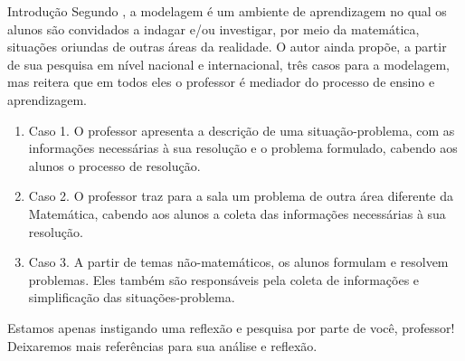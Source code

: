\begin{apresentacao}{Introdução}
  Segundo \citet{barbosa2001}, a modelagem é um ambiente de aprendizagem no qual os alunos são convidados a indagar e/ou investigar, por meio da matemática, situações oriundas de outras áreas da realidade. O autor ainda propõe, a partir de sua pesquisa em nível nacional e internacional, três casos para a modelagem, mas reitera que em todos eles o professor é mediador do processo de ensino e aprendizagem.

  \begin{enumerate}[label=\titem{\arabic*)}]
  \item Caso 1. O professor apresenta a descrição de uma situação-problema, com as informações necessárias à sua resolução e o problema formulado, cabendo aos alunos o processo de resolução. 
  \item Caso 2. O professor traz para a sala um problema de outra área diferente da Matemática, cabendo aos alunos a coleta das informações necessárias à sua resolução. 
  \item Caso 3. A partir de temas não-matemáticos, os alunos formulam e resolvem problemas. Eles também são responsáveis pela coleta de informações e simplificação das situações-problema. 
  \end{enumerate}

  Estamos apenas instigando uma reflexão e pesquisa por parte de você, professor! Deixaremos mais referências para sua análise e reflexão.
\end{apresentacao}

